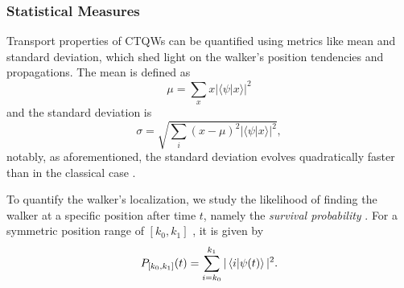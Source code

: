 \documentclass[../../main.tex]{subfiles}
\begin{document}
\subsubsection{Statistical Measures}

Transport properties of CTQWs can be quantified using metrics like mean and
standard deviation, which shed light on the walker's position tendencies and
propagations. The mean is defined as
\begin{equation}
    \mu = \sum_{x} x |\langle \psi | x \rangle|^2
\end{equation}
and the standard deviation is
\begin{equation}
    \sigma = \sqrt{\sum_{i} (x - \mu)^2 |\langle \psi | x \rangle|^2},
\end{equation}
notably, as aforementioned, the standard deviation evolves quadratically faster
than in the classical case \cite{grimmett2003}.


To quantify the walker's localization, we study the likelihood of finding the
walker at a specific position after time $t$, namely the \textit{survival
probability} \cite{Goenuelol2011}. For a symmetric position range of $ 
[k_0,k_1]$ , it is given by
\begin{equation}
    P_{[k_0,k_1]}(t) = \sum_{i=k_0}^{k_1} |\bra{i}\ket{\psi(t)}|^2.
\end{equation}

\end{document}
